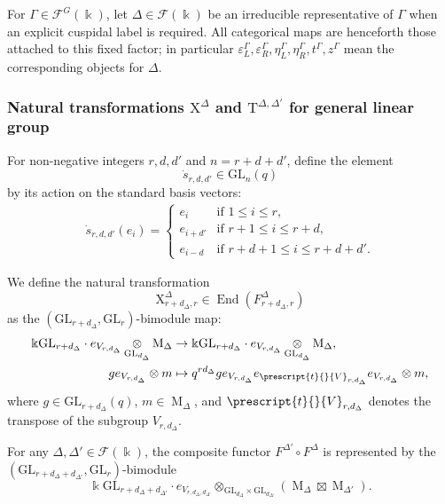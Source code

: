 \documentclass[12pt]{amsart}
\numberwithin{itemcounter}{subsection}
\theoremstyle{plain}
\theoremstyle{definition}
\theoremstyle{remark}
\numberwithin{equation}{section}
\def\k{\Bbbk}
\def\GL{\mathrm{GL}}
\def\M{{\operatorname{M}\nolimits}}
\def\End{\operatorname{End}\nolimits}
\def\End{{\operatorname{End}}}
\DeclareMathOperator*{\ot}{\otimes}
\begin{document}
For $\Gamma\in\mathcal F^G(\k)$, let $\Delta\in\mathcal F(\k)$ be an irreducible representative of $\Gamma$ when an explicit cuspidal label is required.  All categorical maps are henceforth those attached to this fixed factor; in particular
\(
\varepsilon_L^\Gamma,\varepsilon_R^\Gamma,
\eta_L^\Gamma,\eta_R^\Gamma,t^\Gamma,z^\Gamma
\)
mean the corresponding objects for $\Delta$.

\subsubsection{Natural transformations $\mathrm{X}^\Delta$ and $\mathrm{T}^{\Delta,\Delta'}$ for general linear group}

For non-negative integers $r, d, d'$ and $n = r + d + d'$, define the element
\begin{equation*}
    \dot{s}_{r, d, d'} \in \GL_n(q)
\end{equation*}
by its action on the standard basis vectors:
\begin{align*}
    \dot{s}_{r, d, d'}(e_i) =
    \begin{cases}
        e_i & \text{if } 1 \le i \le r, \\[4pt]
        e_{i+d'} & \text{if } r+1 \le i \le r+d, \\[4pt]
        e_{i-d} & \text{if } r+d+1 \le i \le r+d+d'.
    \end{cases}
\end{align*}

We define the natural transformation
\[
\mathrm{X}^{\Delta}_{r+d_\Delta,r} \in \End(F^{\Delta}_{r+d_\Delta,r})
\]
as the $(\GL_{r+d_\Delta}, \GL_r)$-bimodule map:
\[
\begin{aligned}
    \k \GL_{r+d_\Delta}\cdot  e_{V_{r,d_\Delta}} \ot_{\GL_{d_\Delta}} \M_\Delta &\to \k \GL_{r+d_\Delta} \cdot e_{V_{r,d_\Delta}} \ot_{\GL_{d_\Delta}} \M_\Delta, \\
    g e_{V_{r,d_\Delta}} \otimes m &\mapsto q^{rd_\Delta} g e_{V_{r,d_\Delta}} e_{\prescript{t}{}{V}_{r,d_\Delta}} e_{V_{r,d_\Delta}} \otimes m,
\end{aligned}
\]
where $g \in \GL_{r+d_\Delta}(q)$, $m \in \M_\Delta$, and $\prescript{t}{}{V}_{r,d_\Delta}$ denotes the transpose of the subgroup $V_{r,d_\Delta}$.

For any $\Delta, \Delta' \in \mathcal{F}(\k)$, the composite functor $F^{\Delta'} \circ F^\Delta$ is represented by the $(\GL_{r+d_\Delta+d_{\Delta'}}, \GL_r)$-bimodule
\[
\k \GL_{r+d_\Delta+d_{\Delta'}} \cdot e_{V_{r,d_\Delta,d_{\Delta'}}} \ot_{\GL_{d_\Delta} \times \GL_{d_{\Delta'}}} (\M_\Delta \boxtimes \M_{\Delta'}).
\]
\end{document}
